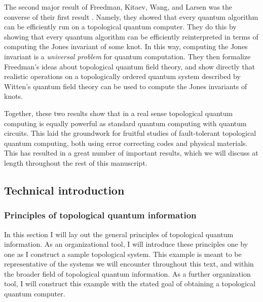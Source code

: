 \documentclass{article}
\theoremstyle{definition}
\numberwithin{figure}{section}
\begin{document}
The second major result of Freedman, Kitaev, Wang, and Larsen was the converse of their first result \cite{freedman2002modular}. Namely, they showed that every quantum algorithm can be efficiently run on a topological quantum computer. They do this by showing that every quantum algorithm can be efficiently reinterpreted in terms of computing the Jones invariant of some knot. In this way, computing the Jones invariant is a \textit{universal problem} for quantum computation. They then formalize Freedman’s ideas about topological quantum field theory, and show directly that realistic operations on a topologically ordered quantum system described by Witten’s quantum field theory can be used to compute the Jones invariants of knots.

Together, these two results show that in a real sense topological quantum computing is equally powerful as standard quantum computing with quantum circuits. This laid the groundwork for fruitful studies of fault-tolerant topological quantum computing, both using error correcting codes and physical materials. This has resulted in a great number of important results, which we will discuss at length throughout the rest of this manuscript.

\subsection{Technical introduction}
\label{technical introduction}

\subsubsection{Principles of topological quantum information}

In this section I will lay out the general principles of topological quantum information. As an organizational tool, I will introduce these principles one by one as I construct a sample topological system. This example is meant to be representative of the systems we will encounter throughout this text, and within the broader field of topological quantum information. As a further organization tool, I will construct this example with the stated goal of obtaining a topological quantum computer.
\end{document}
